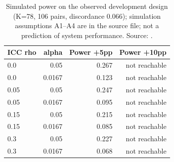 \begin{table}[t]
\centering\scriptsize
\caption{Simulated power on the observed development design (K=78, 106 pairs, discordance 0.066); simulation assumptions A1--A4 are in the source file; not a prediction of system performance. Source: .}
\label{tab:power}
\begin{tabular}{lrrr}
\hline
ICC rho & alpha & Power +5pp & Power +10pp \\
\hline
0.0 & 0.05 & 0.267 & not reachable \\
0.0 & 0.0167 & 0.123 & not reachable \\
0.05 & 0.05 & 0.247 & not reachable \\
0.05 & 0.0167 & 0.095 & not reachable \\
0.15 & 0.05 & 0.215 & not reachable \\
0.15 & 0.0167 & 0.085 & not reachable \\
0.3 & 0.05 & 0.227 & not reachable \\
0.3 & 0.0167 & 0.068 & not reachable \\
\hline
\end{tabular}
\end{table}
